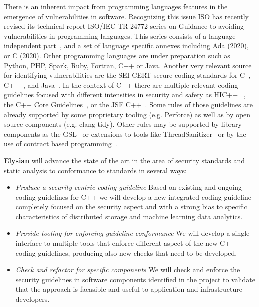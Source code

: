 \documentclass[a4paper,11pt]{article}
\newcommand{\project}[1]{\textbf{#1}\xspace}
\newcommand{\SECURITY}{\project{Elysian}}
\newcommand{\TheProject}{\SECURITY}
\begin{document}
There is an inherent impact from programming languages features in the
emergence of vulnerabilities in software. Recognizing this issue ISO has
recently revised its technical report ISO/IEC  TR 24772 series on Guidance to
avoiding vulnerabilities in programming languages. This series consists of a
language independent part~\cite{iso24772:1}, and a set of language specific
annexes including Ada (2020), or C (2020). Other programming languages are
under preparation such as Python, PHP, Spark, Ruby, Fortran, C++ or Java.
Another very relevant source for identifying vulnerabilities are the SEI CERT
secure coding standards for C~\cite{cert:c}, C++~\cite{cert:cpp}, and
Java~\cite{cert:java}. In the context of C++ there are multiple relevant coding
guidelines focused with different intensities in security and safety as
HIC++~\cite{hicpp} , the C++ Core Guidelines~\cite{cpp:core-guidelines}, or the
JSF C++~\cite{cpp:jsf}. Some rules of those guidelines are already supported by
some proprietary tooling (e.g.  Perforce) as well as by open source components
(e.g.  clang-tidy).  Other rules may be supported by library components as the
GSL~\cite{cpp:gsl} or extensions to tools like ThreadSanitizer~\cite{dolz:2017}
or by the use of contract based programming~\cite{lopez-gomez:2019}.

\begin{mdframed}[backgroundcolor=gray!10]
\TheProject{} will advance the state of the art in the area of security standards and static analysis to conformance to standards in several ways:
\begin{itemize}
\item \emph{Produce a security centric coding guideline} 
Based on existing and ongoing coding guidelines for C++ we will develop a new
integrated coding guideline completely focused on the security aspect and with
a strong bias to specific characteristics of distributed storage and machine
learning data analytics.

\item \emph{Provide tooling for enforcing guideline conformance} 
We will develop a single interface to multiple tools that enforce different aspect
of the new C++ coding guidelines, producing also new checks that need to be developed.

\item \emph{Check and refactor for specific components} 
We will check and enforce the security guidelines in software components identified
in the project to validate that the approach is faeasible and useful to
application and infrastructure developers. 

\end{itemize}
\end{mdframed}
\end{document}
